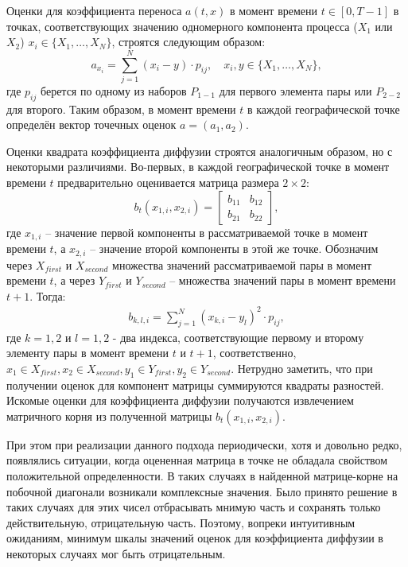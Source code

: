 Оценки для коэффициента переноса $a(t,x)$ в момент времени $t \in [0, T-1]$ в точках, соответствующих значению одномерного компонента процесса ($X_1$ или $X_2$) $x_i \in \{X_1, \dots, X_{N}\}$, строятся следующим образом:  
\begin{equation}
	\label{eq:a_formula}
	a_{x_i} = \sum\limits_{j=1}^{N} (x_i - y)\cdot p_{ij}, \quad x_i, y \in \{X_1, \dots, X_{N}\}, 
\end{equation}
где $p_{ij}$ берется по одному из наборов $P_{1-1}$ для первого элемента пары или $P_{2-2}$ для второго. Таким образом, в момент времени $t$ в каждой географической точке определён вектор точечных оценок $a = (a_1, a_2)$.

Оценки квадрата коэффициента диффузии строятся аналогичным образом, но с некоторыми различиями. Во-первых, в каждой географической точке в момент времени $t$ предварительно оценивается матрица размера $2 \times 2$:
\begin{equation}
	\label{eq:b_coeff_est}
	b_t(x_{1,i}, x_{2, i}) =  \begin{bmatrix}  
		b_{11} & b_{12}\\
		b_{21} & b_{22}
	\end{bmatrix},
\end{equation}
где $x_{1, i}$ -- значение первой компоненты в рассматриваемой точке в момент времени $t$, а $x_{2, i}$ -- значение второй компоненты в этой же точке. Обозначим через $X_{first}$ и $X_{second}$ множества значений рассматриваемой пары в момент времени $t$, а через $Y_{first}$ и $Y_{second}$ -- множества значений пары в момент времени $t+1$. Тогда:
\begin{gather}
	\label{eq:b_formula}
	b_{k,l, i} = \sum_{j=1}^{N} (x_{k, i} - y_l)^2 \cdot p_{ij}, 
\end{gather}
где $k=1,2$ и $l=1,2$ - два индекса, соответствующие первому и второму элементу пары в момент времени $t$ и $t+1$, соответственно, $x_1 \in X_{first}, x_2 \in X_{second}, y_1 \in Y_{first}, y_2 \in Y_{second}$. Нетрудно заметить, что при получении оценок для компонент матрицы суммируются квадраты разностей. Искомые оценки для коэффициента диффузии получаются извлечением матричного корня из полученной матрицы $b_t(x_{1,i}, x_{2, i})$.

При этом при реализации данного подхода периодически, хотя и довольно редко, появлялись ситуации, когда оцененная матрица в точке не обладала свойством положительной определенности. В таких случаях в найденной матрице-корне на побочной диагонали возникали комплексные значения. Было принято решение в таких случаях для этих чисел отбрасывать мнимую часть и сохранять только действительную, отрицательную часть. Поэтому, вопреки интуитивным ожиданиям, минимум шкалы значений оценок для коэффициента диффузии в некоторых случаях мог быть отрицательным.

